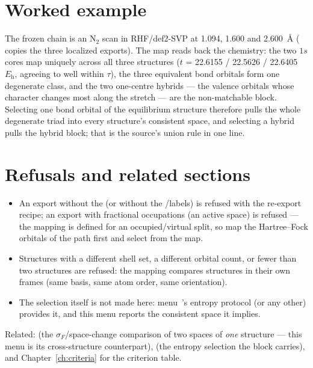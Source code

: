 \section{Worked example}

The frozen chain is an N$_2$ scan in RHF/def2-SVP at 1.094, 1.600 and
2.600~\AA{} ( copies the three localized
exports).  The map reads back the chemistry: the two $1s$ cores map uniquely
across all three structures ($t$ = 22.6155 / 22.5626 / 22.6405~$E_\mathrm{h}$,
agreeing to well within $\tau$), the three equivalent bond orbitals form one
degenerate class, and the two one-centre hybrids --- the valence orbitals whose
character changes most along the stretch --- are the non-matchable block.
Selecting one bond orbital of the equilibrium structure therefore pulls the
whole degenerate triad into every structure's consistent space, and selecting
a hybrid pulls the hybrid block; that is the source's union rule in one line.

\section{Refusals and related sections}

\begin{refusalbox}
\begin{itemize}
  \item An export without the  (or without the
    /labels) is refused with the re-export recipe; an export
    with fractional occupations (an active space) is refused --- the mapping
    is defined for an occupied/virtual split, so map the Hartree--Fock
    orbitals of the path first and select from the map.
  \item Structures with a different shell set, a different orbital count, or
    fewer than two structures are refused: the mapping compares structures in
    their own frames (same basis, same atom order, same orientation).
  \item The selection itself is not made here: menu~'s entropy
    protocol (or any other) provides it, and this menu reports the consistent
    space it implies.
\end{itemize}
\end{refusalbox}

Related:  (the $\sigma_F$/space-change comparison of two spaces of
\emph{one} structure --- this menu is its cross-structure counterpart),
 (the entropy selection the  block carries), and
Chapter~\ref{ch:criteria} for the criterion table.
